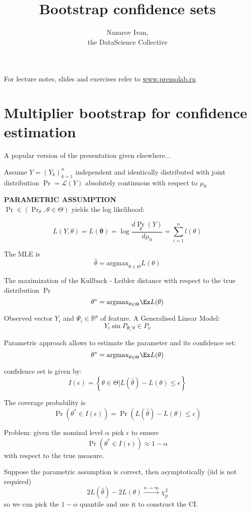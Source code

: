 \documentclass[a4paper]{article}
\title{Bootstrap confidence sets}
\author{Nazarov Ivan, \rus{101мНОД(ИССА)}\\the DataScience Collective}
\newcommand{\obj}[1]{{\left\{ #1 \right \}}}
\newcommand{\brac}[1]{{\left ( #1 \right )}}
\newcommand{\induc}[1]{{\left . #1 \right \vert}}
\newcommand{\Real}{\mathbb{R}}
\begin{document}
\maketitle

For lecture notes, slides and exercises refer to \url{www.premolab.ru}

\section{Multiplier bootstrap for confidence estimation} %
\label{sec:multiplier_bootstrap_for_confidence_estimation}

A popular version of the presentation given elsewhere...


Assume $Y=\brac{Y_k}_{k=1}^n$ independent and identically distributed with joint distribution $\Pr = \mathcal{L}(Y)$ absolutely continuous  with respect to $\mu_0$

\textbf{PARAMETRIC ASSUMPTION}\hfill\\ $\Pr \in \brac{\Pr_\theta, \theta\in \Theta}$ yields the log likelihood:

\[L\brac{Y, \theta} = L(\mathbf{\theta}) = \log\frac{d\Pr_\theta(Y)}{d\mu_0} = \sum_{i=1}^n l(\theta)\]

The MLE is
\[\hat{\theta} = \text{argmax}_{\theta\in \Theta}L(\theta)\]

The maximization of the Kullback - Leibler distance with respect to the true distribution $\Pr$
\[\theta^* = \text{argmax}_{\theta\in \Theta} \Ex L(\theta)\]

Observed vector $Y_i$ and $\Psi_i\in \Real^p$ of feature. A Generalised Linear Model:
\[Y_i \sin P_{\Psi_i'\theta}\in P_\nu\]

Parametric approach allows to estimate the parameter and its confidence set:
\[\theta^* = \text{argmax}_{\theta\in \Theta} \Ex L(\theta)\]

  confidence set is given by:
\[I(\epsilon) = \obj{\induc{\theta\in \Theta} L(\hat{\theta}) - L(\theta) \leq \epsilon }\]

The coverage probability is
\[\Pr\brac{\theta^*\in I(\epsilon)} = \Pr\brac{ L(\hat{\theta}) - L(\theta) \leq \epsilon }\]

Problem: given the nominal level $\alpha$ pick $\epsilon$ to enusre 
\[\Pr\brac{\theta^*\in I(\epsilon)}  \approx 1-\alpha\]
with respect to the true measure.

Suppose the parametric assumption is correct, then asymptotically (iid is not required)
\[2L(\hat{\theta}) - 2L(\theta) \overset{n\to\infty}{\to} \chi^2_p\]
so we can pick the $1-\alpha$ quantile and use it to construct the CI.
\end{document}
